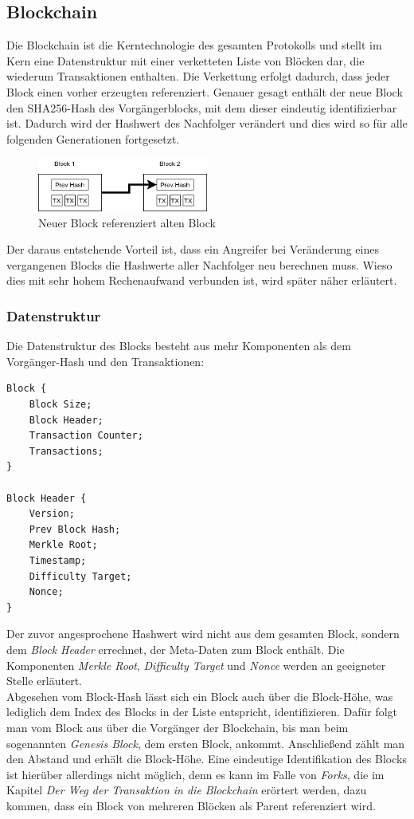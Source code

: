 \subsection{Blockchain}
Die Blockchain ist die Kerntechnologie des gesamten Protokolls und stellt im Kern eine Datenstruktur mit einer verketteten Liste von Blöcken dar, die wiederum Transaktionen enthalten. 
Die Verkettung erfolgt dadurch, dass jeder Block einen vorher erzeugten referenziert. 
Genauer gesagt enthält der neue Block den SHA256-Hash des Vorgängerblocks, mit dem dieser eindeutig identifizierbar ist. Dadurch wird der Hashwert des Nachfolger verändert und dies wird so für alle folgenden Generationen fortgesetzt.
\begin{figure}[htpb]
	\centering
	\includegraphics[width=0.5\textwidth]{images/chain.png}
	\caption{Neuer Block referenziert alten Block}
	\label{6braun:fig:chain}
\end{figure}
Der daraus entstehende Vorteil ist, dass ein Angreifer bei Veränderung eines vergangenen Blocks die Hashwerte aller Nachfolger neu berechnen muss. Wieso dies mit sehr hohem Rechenaufwand verbunden ist, wird später näher erläutert.

\subsubsection{Datenstruktur}
Die Datenstruktur des Blocks besteht aus mehr Komponenten als dem Vorgänger-Hash und den Transaktionen:
\begin{lstlisting}[mathescape, caption={Datenstruktur des Blocks},captionpos=b]
Block {
	Block Size;
	Block Header;
	Transaction Counter;
	Transactions;
}

Block Header {
	Version;
	Prev Block Hash;
	Merkle Root;
	Timestamp;
	Difficulty Target;
	Nonce;
}
\end{lstlisting}
Der zuvor angesprochene Hashwert wird nicht aus dem gesamten Block, sondern dem \emph{Block Header} errechnet, der Meta-Daten zum Block enthält. Die Komponenten \emph{Merkle Root}, \emph{Difficulty Target} und \emph{Nonce} werden an geeigneter Stelle erläutert.\\
Abgesehen vom Block-Hash lässt sich ein Block auch über die Block-Höhe, was lediglich dem Index des Blocks in der Liste entspricht, identifizieren. 
Dafür folgt man vom Block aus über die Vorgänger der Blockchain, bis man beim sogenannten \emph{Genesis Block}, dem ersten Block, ankommt. 
Anschließend zählt man den Abstand und erhält die Block-Höhe.
Eine eindeutige Identifikation des Blocks ist hierüber allerdings nicht möglich, denn es kann im Falle von \emph{Forks}, die im Kapitel \emph{Der Weg der Transaktion in die Blockchain} erörtert werden, dazu kommen, dass ein Block von mehreren Blöcken als Parent referenziert wird.\\
